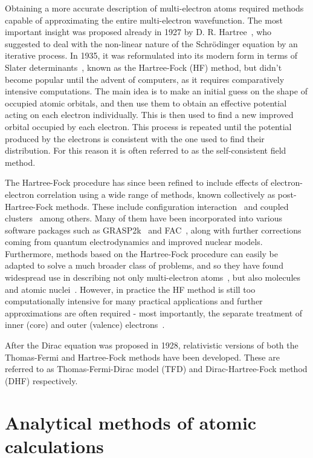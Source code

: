 Obtaining a more accurate description of multi-electron atoms required methods capable of approximating the entire multi-electron wavefunction. The most important insight was proposed already in 1927 by D. R. Hartree~\cite{hartree_1928}, who suggested to deal with the non-linear nature of the Schr\"{o}dinger equation by an iterative process. In 1935, it was reformulated into its modern form in terms of Slater determinants~\cite{rspa19350085}, known as the Hartree-Fock (HF) method, but didn't become popular until the advent of computers, as it requires comparatively intensive computations. The main idea is to make an initial guess on the shape of occupied atomic orbitals, and then use them to obtain an effective potential acting on each electron individually. This is then used to find a new improved orbital occupied by each electron. This process is repeated until the potential produced by the electrons is consistent with the one used to find their distribution. For this reason it is often referred to as the self-consistent field method.

The Hartree-Fock procedure has since been refined to include effects of electron-electron correlation using a wide range of methods, known collectively as post-Hartree-Fock methods. These include configuration interaction~\cite{Tup2003OS} and coupled clusters~\cite{bostock_fully_2011} among others. %
Many of them have been incorporated into various software packages such as GRASP2k~\cite{jonsson_new_2013, DYALL1989425} and FAC~\cite{FAC}, along with further corrections coming from quantum electrodynamics and improved nuclear models. Furthermore, methods based on the Hartree-Fock procedure can easily be adapted to solve a much broader class of problems, and so they have found widespread use in describing not only multi-electron atoms~\cite{fischer1977hartree}, but also molecules~\cite{puchalski_relativistic_2017, jensen2007introduction} and atomic nuclei~\cite{TARBUTTON19681}. However, in practice the HF method is still too computationally intensive for many practical applications and further approximations are often required - most importantly, the separate treatment of inner (core) and outer (valence) electrons~\cite{pseudopotentials}.

After the Dirac equation was proposed in 1928, relativistic versions of both the Thomas-Fermi and Hartree-Fock methods have been developed. These are referred to as Thomas-Fermi-Dirac model (TFD) and Dirac-Hartree-Fock method (DHF) respectively.

\section{Analytical methods of atomic calculations}

